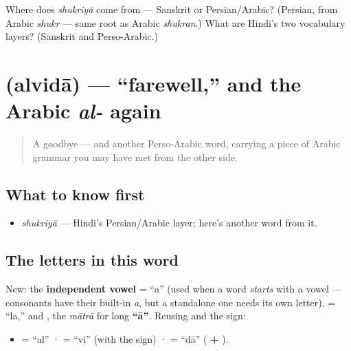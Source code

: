 \begin{tcolorbox}[breakable,colback=teal!4,colframe=teal!35!black,title={Before you move on}]
Where does \emph{shukriyā} come from — Sanskrit or Persian/Arabic? (Persian, from Arabic \emph{shukr} — same root as Arabic \emph{shukran}.) What are Hindi's two vocabulary layers? (Sanskrit and Perso-Arabic.)
\end{tcolorbox}
\section[\texorpdfstring{\hi{अलविदा} (alvidā)}{अलविदा (alvidā)}]{ (alvidā) — \textquotedblleft{}farewell,\textquotedblright{} and the Arabic \emph{al-} again}

\label{lesson:HI-C01-alvida}



\begin{quote}
A goodbye — and another Perso-Arabic word, carrying a piece of Arabic grammar you may have met from the other side.
\end{quote}

\subsection*{What to know first}
\begin{itemize}
\raggedright
  \item \emph{shukriyā} — Hindi's Persian/Arabic layer; here's another word from it.
\end{itemize}

\subsection*{The letters in this word}
New: the \textbf{independent vowel } = \textquotedblleft{}a\textquotedblright{} (used when a word \emph{starts} with a vowel — consonants have their built-in \emph{a}, but a standalone one needs its own letter), \textbf{} = \textquotedblleft{}la,\textquotedblright{} and \textbf{}, the \emph{mātrā} for long \textbf{\textquotedblleft{}ā\textquotedblright{}}. Reusing \textbf{ } and the \textbf{} sign:

\begin{itemize}
\raggedright
  \item \textbf{} = \textquotedblleft{}al\textquotedblright{} · \textbf{} = \textquotedblleft{}vi\textquotedblright{} (with the \textbf{} sign) · \textbf{} = \textquotedblleft{}dā\textquotedblright{} (\textbf{ + }).
\end{itemize}

